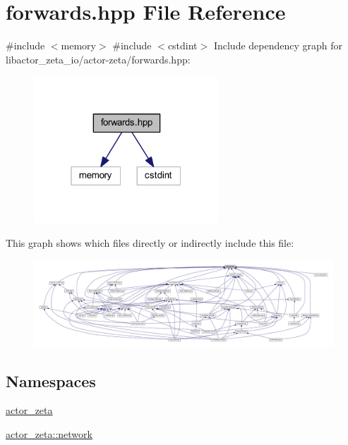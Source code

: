 \hypertarget{libactor__zeta__io_2actor-zeta_2forwards_8hpp}{}\section{forwards.\+hpp File Reference}
\label{libactor__zeta__io_2actor-zeta_2forwards_8hpp}
{\ttfamily \#include $<$memory$>$}\newline
{\ttfamily \#include $<$cstdint$>$}\newline
Include dependency graph for libactor\+\_\+zeta\+\_\+io/actor-\/zeta/forwards.hpp\+:\nopagebreak
\begin{figure}[H]
\begin{center}
\leavevmode
\includegraphics[width=196pt]{libactor__zeta__io_2actor-zeta_2forwards_8hpp__incl}
\end{center}
\end{figure}
This graph shows which files directly or indirectly include this file\+:\nopagebreak
\begin{figure}[H]
\begin{center}
\leavevmode
\includegraphics[width=350pt]{libactor__zeta__io_2actor-zeta_2forwards_8hpp__dep__incl}
\end{center}
\end{figure}
\subsection*{Namespaces}
\begin{DoxyCompactItemize}
\item 
 \hyperlink{namespaceactor__zeta}{actor\+\_\+zeta}
\item 
 \hyperlink{namespaceactor__zeta_1_1network}{actor\+\_\+zeta\+::network}
\end{DoxyCompactItemize}
